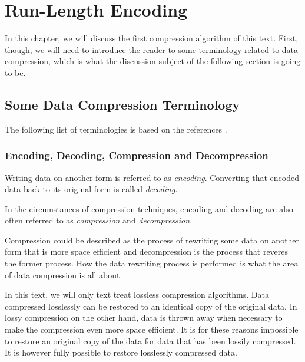 \begin{comment}
  
\end{comment}

\chapter{Run-Length Encoding}
\label{cha:rle}

In this chapter, we will discuss the first compression algorithm of this
text. First, though, we will need to introduce the reader to some
terminology related to data compression, which is what the discussion
subject of the following section is going to be.

\section{Some Data Compression Terminology}

The following list of terminologies is based on the references
\cite{Salomon:2004:DCC,mark1996data_compression_book,Bell:1989:MTC:76894.76896}.

\subsection{Encoding, Decoding, Compression and Decompression}

Writing data on another form is referred to as
\textit{encoding}. Converting that encoded data back to its original
form is called \textit{decoding}.

In the circumstances of compression techniques, encoding and decoding
are also often referred to as \textit{compression}
and \textit{decompression}.

Compression could be described as the process of rewriting some data
on another form that is more space efficient and decompression is the
process that reveres the former process. How the data rewriting
process is performed is what the area of data compression is all
about.

In this text, we will only text treat lossless compression
algorithms. Data compressed losslessly can be restored to an identical
copy of the original data. In lossy compression on the other hand,
data is thrown away when necessary to make the compression even more
space efficient. It is for these reasons impossible to restore an
original copy of the data for data that has been lossily
compressed. It is however fully possible to restore losslessly
compressed data.

